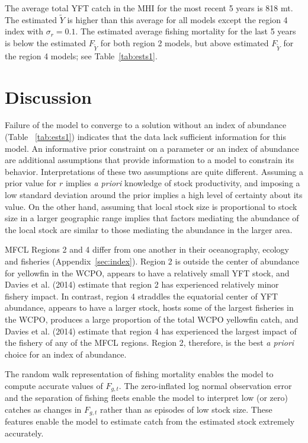 \documentclass[12pt,letterpaper]{article}
\newcommand\MSY{\widetilde{Y}}
\newcommand\Fmsy{F_{\MSY}}
\begin{document}
The average total YFT catch in the MHI for the most recent 5 years
is 818 mt. The estimated $\MSY$ is higher than this average for all
models except the region 4 index with $\sigma_r=0.1$.
The estimated average fishing mortality for the last 5 years is below
the estimated $\Fmsy$ for both region 2 models, but above estimated
$\Fmsy$ for the region 4 models; see Table~\ref{tab:ests1}.

\section*{Discussion}
Failure of the model to converge to a solution without an index of
abundance (Table~ \ref{tab:ests1})
indicates that the data lack sufficient information for this model.
An informative prior constraint on a parameter or an index of abundance are 
additional assumptions that provide information to a model
to constrain its behavior.
Interpretations of these two assumptions are quite different. 
Assuming a prior value for $r$ implies {\it a priori} knowledge of stock
productivity, and imposing a low standard deviation around the
prior implies a high level of certainty about its value.
On the other hand,
assuming that local stock size is proportional to stock size in
a larger geographic range
implies that factors mediating the abundance
of the local stock are similar to those mediating the
abundance in the larger area.

MFCL Regions 2 and 4 differ from one another in their oceanography,
ecology and fisheries (Appendix~\ref{sec:index}).
Region 2 is outside the center of abundance for yellowfin in the
WCPO, appears to have a relatively small YFT stock, and Davies et al. (2014)
estimate that region 2 has experienced relatively minor fishery impact.
In contrast, region 4 straddles the equatorial center of YFT abundance,
appears to have a larger stock, hosts some of the largest fisheries in the WCPO,
produces a large proportion of the total WCPO yellowfin catch, and
Davies et al. (2014) estimate that region 4 has experienced
the largest impact of the fishery of any of the MFCL regions.
Region 2, therefore, is the best {\it a priori} choice for
an index of abundance.

The random walk representation of fishing mortality enables
the model to compute accurate values of $F_{g,t}$. The zero-inflated
log normal observation error and the separation of fishing fleets
enable the model to interpret low (or zero) catches as changes in
$F_{g,t}$ rather than as episodes of low stock size.
These features enable the model to estimate catch
from the estimated stock extremely accurately.
\end{document}
